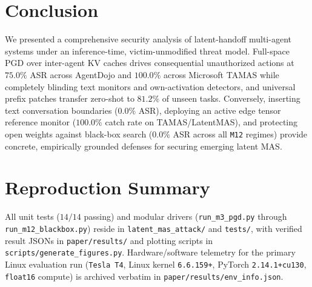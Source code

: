 \documentclass{article}
\begin{document}
\section{Conclusion}
\label{sec:conclusion}
We presented a comprehensive security analysis of latent-handoff multi-agent
systems under an inference-time, victim-unmodified threat model. Full-space PGD
over inter-agent KV caches drives consequential unauthorized actions at $75.0\%$
ASR across AgentDojo and $100.0\%$ across Microsoft TAMAS while completely
blinding text monitors and own-activation detectors, and universal prefix
patches transfer zero-shot to $81.2\%$ of unseen tasks. Conversely, inserting text
conversation boundaries ($0.0\%$ ASR), deploying an active edge tensor
reference monitor ($100.0\%$ catch rate on TAMAS/LatentMAS), and protecting open
weights against black-box search ($0.0\%$ ASR across all \texttt{M12} regimes)
provide concrete, empirically grounded defenses for securing emerging latent MAS.

\appendix
\section{Reproduction Summary}
\label{app:repro}
All unit tests ($14/14$ passing) and modular drivers (\texttt{run\_m3\_pgd.py}
through \texttt{run\_m12\_blackbox.py}) reside in \texttt{latent\_mas\_attack/}
and \texttt{tests/}, with verified result JSONs in \texttt{paper/results/} and
plotting scripts in \texttt{scripts/generate\_figures.py}. Hardware/software
telemetry for the primary Linux evaluation run (\texttt{Tesla T4}, Linux kernel
\texttt{6.6.159+}, PyTorch \texttt{2.14.1+cu130}, \texttt{float16} compute) is
archived verbatim in \texttt{paper/results/env\_info.json}.



\end{document}
